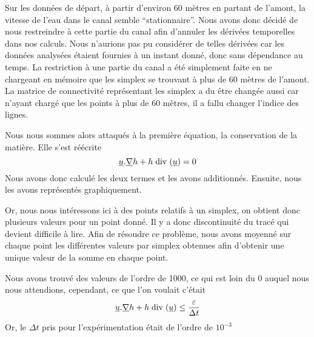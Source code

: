 \documentclass[a4paper,10pt]{article}
\begin{document}
  Sur les données de départ, à partir d'environ 60 mètres en partant de l'amont, la vitesse de l'eau dans le canal
  semble ``stationnaire''. Nous avons donc décidé de nous restreindre à cette partie du canal afin d'annuler les dérivées
  temporelles dans nos calculs. Nous n'aurions pas pu considérer de telles dérivées car les données analysées étaient fournies à
  un instant donné, donc sans dépendance au temps.
  La restriction à une partie du canal a été simplement faite en ne chargeant en mémoire que les simplex se trouvant à plus de
  60 mètres de l'amont. La matrice de connectivité représentant les simplex a du être changée aussi car n'ayant chargé que les
  points à plus de 60 mètres, il a fallu changer l'indice des lignes.
  
  Nous nous sommes alors attaqués à la première équation, la conservation de la matière.
  Elle s'est réécrite
  \begin{equation}
    \underline u . \underline \nabla h + h\bdiv(\underline u) = 0
  \end{equation}
  Nous avons donc calculé les deux termes et les avons additionnés. Ensuite, nous les avons représentés graphiquement.
  
  Or, nous nous intéressons ici à des points relatifs à un simplex, on obtient donc plusieurs valeurs pour un point donné.
  Il y a donc discontinuité du tracé qui devient difficile à lire. Afin de résoudre ce problème, nous avons moyenné sur
  chaque point les différentes valeurs par simplex obtenues afin d'obtenir une unique valeur de la somme en chaque point.
  
  Nous avons trouvé des valeurs de l'ordre de 1000, ce qui est loin du 0 auquel nous nous attendions, cependant, ce que l'on voulait
  c'était
  \begin{equation}
    \underline u . \underline \nabla h + h\bdiv(\underline u) \leq \frac{\varepsilon}{\Delta t}
  \end{equation}
  Or, le $\Delta t$ pris pour l'expérimentation était de l'ordre de $10^{-3}$
  
\end{document}
